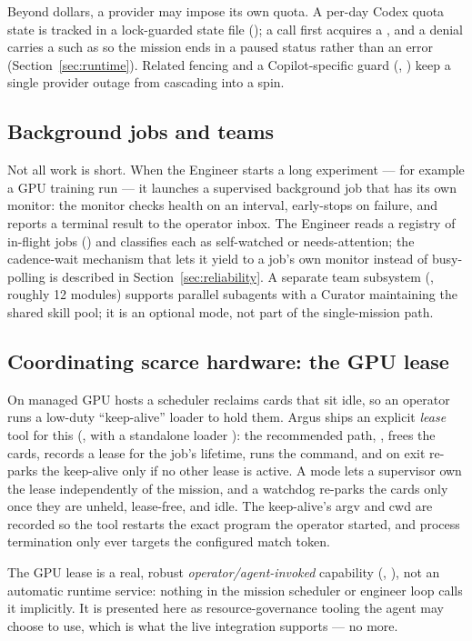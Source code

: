 Beyond dollars, a provider may impose its own quota. A per-day Codex quota state is
tracked in a lock-guarded state file (); a call
first acquires a , and a denial carries a
 such as  so the mission ends in a paused
status rather than an error (Section~\ref{sec:runtime}). Related fencing and a
Copilot-specific guard (,
) keep a single provider outage from cascading
into a spin.

\subsection{Background jobs and teams}

Not all work is short. When the Engineer starts a long experiment --- for example a
GPU training run --- it launches a supervised background job that has its own
monitor: the monitor checks health on an interval, early-stops on failure, and
reports a terminal result to the operator inbox. The Engineer reads a registry of
in-flight jobs () and classifies each as
self-watched or needs-attention; the cadence-wait mechanism that lets it yield to a
job's own monitor instead of busy-polling is described in
Section~\ref{sec:reliability}. A separate team subsystem
(, roughly 12 modules) supports parallel subagents with
a Curator maintaining the shared skill pool; it is an optional mode, not part of
the single-mission path.

\subsection{Coordinating scarce hardware: the GPU lease}

On managed GPU hosts a scheduler reclaims cards that sit idle, so an operator runs
a low-duty ``keep-alive'' loader to hold them. Argus ships an explicit
\emph{lease} tool for this (, with a
standalone loader ): the recommended path,
, frees the cards, records a lease for the job's
lifetime, runs the command, and on exit re-parks the keep-alive only if no other
lease is active. A  mode lets a supervisor own the lease
independently of the mission, and a watchdog re-parks the cards only once they are
unheld, lease-free, and idle. The keep-alive's argv and cwd are recorded so the
tool restarts the exact program the operator started, and process termination only
ever targets the configured match token.

\begin{callout}
The GPU lease is a real, robust \emph{operator/agent-invoked} capability
(, ), not an
automatic runtime service: nothing in the mission scheduler or engineer loop calls
it implicitly. It is presented here as resource-governance tooling the agent may
choose to use, which is what the live integration supports --- no more.
\end{callout}
